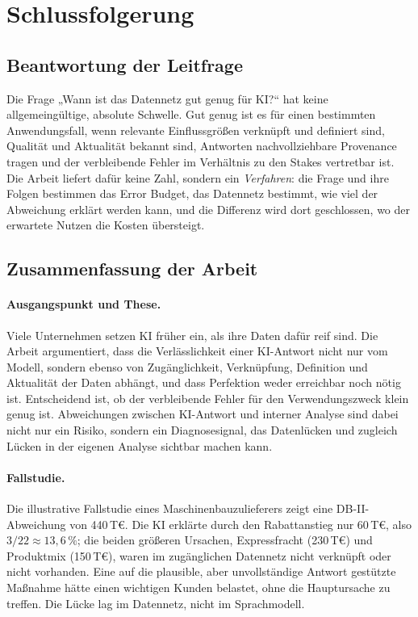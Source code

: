 \documentclass[a4paper,12pt,twoside]{report}
\theoremstyle{definition}
\begin{document}
\chapter{Schlussfolgerung}
\label{sec:conclusion}

\section{Beantwortung der Leitfrage}
Die Frage „Wann ist das Datennetz gut genug für KI?“ hat keine allgemeingültige, absolute Schwelle. Gut genug ist es für einen bestimmten Anwendungsfall, wenn relevante Einflussgrößen verknüpft und definiert sind, Qualität und Aktualität bekannt sind, Antworten nachvollziehbare Provenance tragen und der verbleibende Fehler im Verhältnis zu den Stakes vertretbar ist. Die Arbeit liefert dafür keine Zahl, sondern ein \emph{Verfahren}: die Frage und ihre Folgen bestimmen das Error Budget, das Datennetz bestimmt, wie viel der Abweichung erklärt werden kann, und die Differenz wird dort geschlossen, wo der erwartete Nutzen die Kosten übersteigt.

\section{Zusammenfassung der Arbeit}
\subsubsection{Ausgangspunkt und These.}
Viele Unternehmen setzen KI früher ein, als ihre Daten dafür reif sind. Die Arbeit argumentiert, dass die Verlässlichkeit einer KI-Antwort nicht nur vom Modell, sondern ebenso von Zugänglichkeit, Verknüpfung, Definition und Aktualität der Daten abhängt, und dass Perfektion weder erreichbar noch nötig ist. Entscheidend ist, ob der verbleibende Fehler für den Verwendungszweck klein genug ist. Abweichungen zwischen KI-Antwort und interner Analyse sind dabei nicht nur ein Risiko, sondern ein Diagnosesignal, das Datenlücken und zugleich Lücken in der eigenen Analyse sichtbar machen kann.

\subsubsection{Fallstudie.}
Die illustrative Fallstudie eines Maschinenbauzulieferers zeigt eine DB-II-Abweichung von 440\,T€. Die KI erklärte durch den Rabattanstieg nur 60\,T€, also $3/22\approx 13{,}6\,\%$; die beiden größeren Ursachen, Expressfracht (230\,T€) und Produktmix (150\,T€), waren im zugänglichen Datennetz nicht verknüpft oder nicht vorhanden. Eine auf die plausible, aber unvollständige Antwort gestützte Maßnahme hätte einen wichtigen Kunden belastet, ohne die Hauptursache zu treffen. Die Lücke lag im Datennetz, nicht im Sprachmodell.
\end{document}
